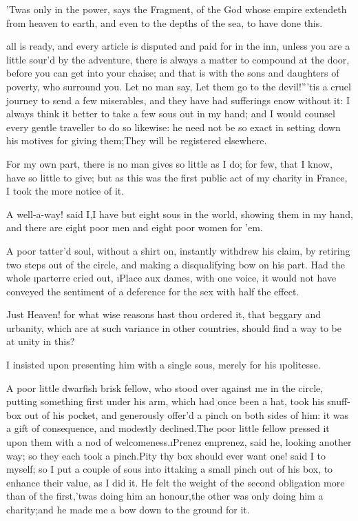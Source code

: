 \documentclass[twoside]{article}
\begin{document}
’Twas only in the power, says the Fragment, of the God whose empire
extendeth from heaven to earth, and even to the depths of the sea, to
have done this.






 all is ready, and every article is disputed and paid for in the inn,
unless you are a little sour’d by the adventure, there is always a matter
to compound at the door, before you can get into your chaise; and that is
with the sons and daughters of poverty, who surround you.  Let no man
say, \lqq Let them go to the devil!”\tsk ’tis a cruel journey to send a few
miserables, and they have had sufferings enow without it: I always think
it better to take a few sous out in my hand; and I would counsel every
gentle traveller to do so likewise: he need not be so exact in setting
down his motives for giving them;\tsk They will be registered elsewhere.

For my own part, there is no man gives so little as I do; for few, that I
know, have so little to give; but as this was the first public act of my
charity in France, I took the more notice of it.

A well-a-way! said I,\tsk I have but eight sous in the world, showing them in
my hand, and there are eight poor men and eight poor women for ’em.

A poor tatter’d soul, without a shirt on, instantly withdrew his claim,
by retiring two steps out of the circle, and making a disqualifying bow
on his part.  Had the whole \i{parterre} cried out, \i{Place aux dames}, with
one voice, it would not have conveyed the sentiment of a deference for
the sex with half the effect.

Just Heaven! for what wise reasons hast thou ordered it, that beggary and
urbanity, which are at such variance in other countries, should find a
way to be at unity in this?

\tsk I insisted upon presenting him with a single sous, merely for his
\i{politesse}.

A poor little dwarfish brisk fellow, who stood over against me in the
circle, putting something first under his arm, which had once been a hat,
took his snuff-box out of his pocket, and generously offer’d a pinch on
both sides of him: it was a gift of consequence, and modestly
declined.\tsk The poor little fellow pressed it upon them with a nod of
welcomeness.\tsk \i{Prenez en}\tsk \i{prenez}, said he, looking another way; so they
each took a pinch.\tsk Pity thy box should ever want one! said I to myself;
so I put a couple of sous into it\tsk taking a small pinch out of his box, to
enhance their value, as I did it.  He felt the weight of the second
obligation more than of the first,\tsk ’twas doing him an honour,\tsk the other
was only doing him a charity;\tsk and he made me a bow down to the ground for
it.
\end{document}
